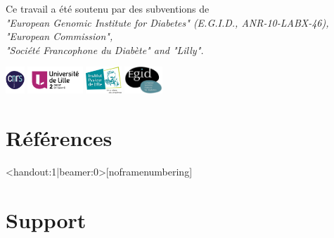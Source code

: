 \documentclass[10pt,  xcolors={RGB}, hyperref={%
    pdfpagelabels=false,
    colorlinks=true,
    pdftex=true,
    bookmarks=true,
    bookmarksopen=true,
    hyperfootnotes=true}]{beamer}
\newif\ifsecpart
\begin{document}
\begin{frame}
\begin{center}
{\begin{singlespace*}
{                    Ce travail a été soutenu par des subventions de\\
                \textit{
                    "European Genomic Institute for Diabetes" (E.G.I.D., ANR-10-LABX-46),\\
                    "European Commission",\\
                    "Société Francophone du Diabète" and "Lilly".
                }
            }
        \end{singlespace*}
        }
        \vspace{1em}
        \par{%
            \includegraphics[height=1cm, keepaspectratio]{template/logo_cnrs.pdf}\hspace{1.5cm}
            \includegraphics[height=1cm, keepaspectratio]{template/UL2-WEB-2014.png}\hspace{1.5cm}
            \includegraphics[height=1cm, keepaspectratio]{template/Institut-Pasteur-de-Lille.png}\hspace{1.5cm}
            \includegraphics[height=1cm, keepaspectratio]{template/logo_egid.pdf}%
        }
\end{center}
\end{frame}
\note{}


\secparttrue
\section*{Références}
\begin{frame}<handout:1|beamer:0>[noframenumbering]{\secname}


\end{frame}
\note{}

\section*{Support}
\end{document}
